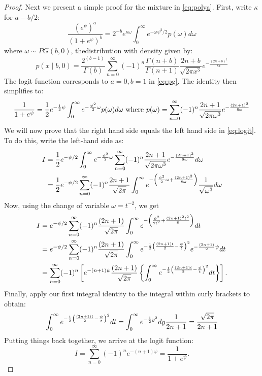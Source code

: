 \documentclass[lineno]{biometrika}
\begin{document}
\begin{proof}
%
Next we present a simple proof for the \PG mixture in \eqref{eq:polya}. First, write $\kappa$ for $a-b/2$: 
\begin{equation}
  \frac{(e^{\psi})^a}{(1+e^{\psi})^b} = 2^{-b} e^{\kappa \omega} \int_0^{\infty} e^{-\omega \psi^2/2} p(\omega) d\omega \label{eq:pg}
\end{equation}
where $\omega \sim PG(b,0)$, the\PG distribution with density given by: 
$$
p(x \mid b, 0) = \frac{2^{(b-1)}}{\Gamma(b)} \sum_{n=0}^{\infty} (-1)^n \frac{\Gamma(n+b)}{\Gamma(n+1)} \frac{2n+b}{\sqrt{2\pi x^3}} e^{-\frac{(2n+b)^2}{8x}} 
$$
The logit function corresponds to $a=0,b=1$ in \eqref{eq:pg}. The identity then simplifies to:  
\begin{equation}
  \frac{1}{1+e^{\psi}} = \half e^{-\half \psi} \int_0^{\infty} e^{-\frac{\psi^2}{2} \omega} p(\omega) d\omega 
  \text{ where } p(\omega) = \sum_{n=0}^{\infty} (-1)^n \frac{2n+1}{\sqrt{2\pi \omega^3}} e^{-\frac{(2n+1)^2}{8\omega}}
  \label{eq:logit}
\end{equation}
We will now prove that the right hand side equals the left hand side in \eqref{eq:logit}. To do this, write the left-hand side as:
\begin{align*}
I & = \frac{1}{2} e^{-\psi/2} \int_0^{\infty} e^{-\frac{\psi^2}{2} \omega} \sum_{n=0}^{\infty} (-1)^n \frac{2n+1}{\sqrt{2\pi \omega^3}} e^{-\frac{(2n+1)^2}{8\omega}}d \omega \\
& = \frac{1}{2} e^{-\psi/2}  \sum_{n=0}^{\infty} (-1)^n \frac{2n+1}{\sqrt{2\pi}} \int_0^{\infty} e^{- \left( \frac{\psi^2}{2}  \omega + \frac{(2n+1)^2}{8\omega} \right) } \frac{1}{\sqrt{ \omega^3}} d\omega 
\end{align*}
Now, using the change of variable $\omega = t^{-2}$, we get 
\begin{align*}
I & = e^{-\psi/2}  \sum_{n=0}^{\infty} (-1)^n \frac{(2n+1)}{\sqrt{2\pi}} \int_{0}^{\infty} e^{-\left( \frac{\psi^2}{2t^2} + \frac{(2n+1)^2 t^2}{8} \right)} d t \\
& =  e^{-\psi/2}  \sum_{n=0}^{\infty} (-1)^n \frac{(2n+1)}{\sqrt{2\pi}} \int_{0}^{\infty} e^{-\frac{1}{2} \left( \frac{(2n+1)t}{2} - \frac{\psi}{t}\right)^2 } e^{- \frac{(2n+1)}{2} \psi}d t \\
& = \sum_{n=0}^{\infty} (-1)^n \left[  e^{-(n+1)\psi} \frac{(2n+1)}{\sqrt{2\pi}} \left\{ \int_{0}^{\infty}e^{-\frac{1}{2} \left( \frac{(2n+1)t}{2} - \frac{\psi}{t}\right)^2 } dt \right\} \right].
\end{align*}
Finally, apply our first integral identity to the integral within curly brackets to obtain: 
$$ 
\int_{0}^{\infty}e^{-\frac{1}{2} \left( \frac{(2n+1)t}{2} - \frac{\psi}{t}\right)^2 } dt = \int_0^{\infty} e^{-\frac{1}{2} y^2} dy \frac{1}{2n+1} = \frac{\sqrt{2\pi}}{2n+1}
$$
Putting things back together, we arrive at the logit function: 
$$
I = \sum_{n=0}^{\infty} (-1)^n e^{-(n+1)\psi} = \frac{1}{1+e^{\psi}}.
$$
\end{proof}
\end{document}
